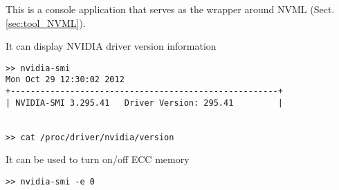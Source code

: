 This is a console application that serves as the wrapper around NVML
(Sect.\ref{sec:tool_NVML}).

It can display NVIDIA driver version information 
\begin{verbatim}
>> nvidia-smi 
Mon Oct 29 12:30:02 2012       
+------------------------------------------------------+                       
| NVIDIA-SMI 3.295.41   Driver Version: 295.41         |


>> cat /proc/driver/nvidia/version   
\end{verbatim}

It can be used to turn on/off ECC memory 
\begin{verbatim}
>> nvidia-smi -e 0
\end{verbatim}